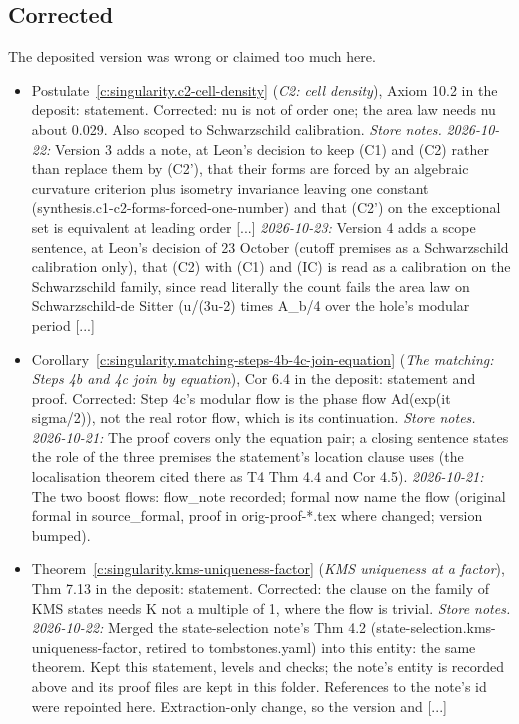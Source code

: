 \documentclass[11pt]{article}
\theoremstyle{definition}
\theoremstyle{plain}
\begin{document}
\subsection*{Corrected}
The deposited version was wrong or claimed too much here.
\begin{itemize}\setlength{\itemsep}{2pt}
\item Postulate~\ref{c:singularity.c2-cell-density} (\emph{C2: cell density}), Axiom 10.2 in the deposit: statement. Corrected: nu is not of order one; the area law needs nu about 0.029. Also scoped to Schwarzschild calibration. \emph{Store notes.} \emph{2026-10-22:} Version 3 adds a note, at Leon's decision to keep (C1) and (C2) rather than replace them by (C2'), that their forms are forced by an algebraic curvature criterion plus isometry invariance leaving one constant (synthesis.c1-c2-forms-forced-one-number) and that (C2') on the exceptional set is equivalent at leading order [...] \emph{2026-10-23:} Version 4 adds a scope sentence, at Leon's decision of 23 October (cutoff premises as a Schwarzschild calibration only), that (C2) with (C1) and (IC) is read as a calibration on the Schwarzschild family, since read literally the count fails the area law on Schwarzschild-de Sitter (u/(3u-2) times A\_b/4 over the hole's modular period [...]
\item Corollary~\ref{c:singularity.matching-steps-4b-4c-join-equation} (\emph{The matching: Steps 4b and 4c join by equation}), Cor 6.4 in the deposit: statement and proof. Corrected: Step 4c's modular flow is the phase flow Ad(exp(it sigma/2)), not the real rotor flow, which is its continuation. \emph{Store notes.} \emph{2026-10-21:} The proof covers only the equation pair; a closing sentence states the role of the three premises the statement's location clause uses (the localisation theorem cited there as T4 Thm 4.4 and Cor 4.5). \emph{2026-10-21:} The two boost flows: flow\_note recorded; formal now name the flow (original formal in source\_formal, proof in orig-proof-*.tex where changed; version bumped).
\item Theorem~\ref{c:singularity.kms-uniqueness-factor} (\emph{KMS uniqueness at a factor}), Thm 7.13 in the deposit: statement. Corrected: the clause on the family of KMS states needs K not a multiple of 1, where the flow is trivial. \emph{Store notes.} \emph{2026-10-22:} Merged the state-selection note's Thm 4.2 (state-selection.kms-uniqueness-factor, retired to tombstones.yaml) into this entity: the same theorem. Kept this statement, levels and checks; the note's entity is recorded above and its proof files are kept in this folder. References to the note's id were repointed here. Extraction-only change, so the version and [...]

\end{itemize}
\end{document}
